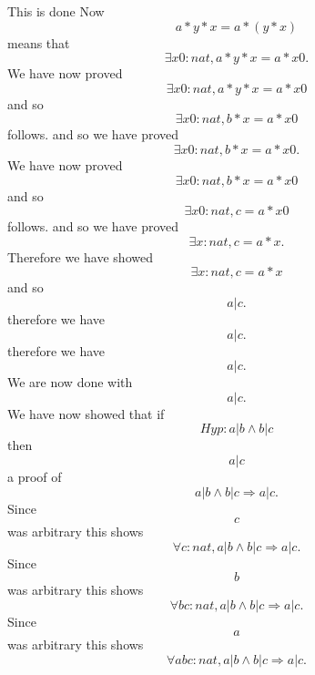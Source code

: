 \begin{tcolorbox}[colback=gray!10!white,colframe=white,breakable]
 This is done Now $$a * y * x = a * (y * x) $$ means that $$\exists x0 : nat, a * y * x = a * x0 .$$ We have now proved $$\exists x0 : nat, a * y * x = a * x0 $$ and so $$\exists x0 : nat, b * x = a * x0 $$ follows. and so we have proved $$\exists x0 : nat, b * x = a * x0 .$$ We have now proved $$\exists x0 : nat, b * x = a * x0 $$ and so $$\exists x0 : nat, c = a * x0 $$ follows. and so we have proved $$\exists x : nat, c = a * x .$$ Therefore we have showed $$\exists x : nat, c = a * x $$ and so $$a | c .$$ therefore we have $$a | c .$$ therefore we have $$a | c .$$ We are now done with $$a | c .$$ We have now showed that if $$Hyp : a | b \land b | c $$ then $$a | c $$ a proof of $$a | b \land b | c \Rightarrow a | c .$$ Since $$c$$ was arbitrary this shows $$\forall c : nat, a | b \land b | c \Rightarrow a | c .$$ Since $$b$$ was arbitrary this shows $$\forall b c : nat, a | b \land b | c \Rightarrow a | c .$$ Since $$a$$ was arbitrary this shows $$\forall a b c : nat, a | b \land b | c \Rightarrow a | c .$$
 

\end{tcolorbox}








